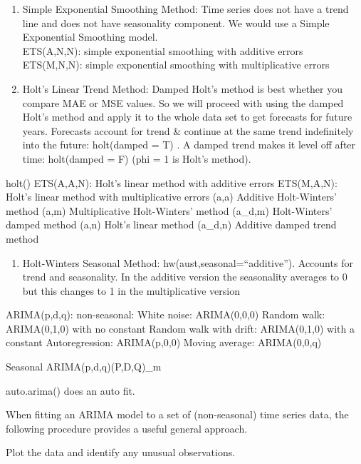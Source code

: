 \documentclass[]{book}
\providecommand{\tightlist}{%
  \setlength{\itemsep}{0pt}\setlength{\parskip}{0pt}}
\theoremstyle{definition}
\theoremstyle{definition}
\theoremstyle{definition}
\theoremstyle{remark}
\begin{document}
\begin{enumerate}
\def\labelenumi{\arabic{enumi}.}
\item
  Simple Exponential Smoothing Method: Time series does not have a trend
  line and does not have seasonality component. We would use a Simple
  Exponential Smoothing model.\\
  ETS(A,N,N): simple exponential smoothing with additive errors
  \textbar{} ETS(M,N,N): simple exponential smoothing with
  multiplicative errors
\item
  Holt's Linear Trend Method: Damped Holt's method is best whether you
  compare MAE or MSE values. So we will proceed with using the damped
  Holt's method and apply it to the whole data set to get forecasts for
  future years. Forecasts account for trend \& continue at the same
  trend indefinitely into the future: holt(damped = T) . A damped trend
  makes it level off after time: holt(damped = F) (phi = 1 is Holt's
  method).
\end{enumerate}

holt() \textbar{} ETS(A,A,N): Holt's linear method with additive errors
\textbar{} ETS(M,A,N): Holt's linear method with multiplicative errors
\textbar{} (a,a) Additive Holt-Winters' method \textbar{} (a,m)
Multiplicative Holt-Winters' method \textbar{} (a\_d,m) Holt-Winters'
damped method \textbar{} (a,n) Holt's linear method \textbar{} (a\_d,n)
Additive damped trend method

\begin{enumerate}
\def\labelenumi{\arabic{enumi}.}
\setcounter{enumi}{7}
\tightlist
\item
  Holt-Winters Seasonal Method: hw(aust,seasonal=``additive''). Accounts
  for trend and seasonality. In the additive version the seasonality
  averages to 0 but this changes to 1 in the multiplicative version
\end{enumerate}

ARIMA(p,d,q): non-seasonal: White noise: ARIMA(0,0,0) Random walk:
ARIMA(0,1,0) with no constant Random walk with drift: ARIMA(0,1,0) with
a constant Autoregression: ARIMA(p,0,0) Moving average: ARIMA(0,0,q)

Seasonal ARIMA(p,d,q)(P,D,Q)\_m

auto.arima() does an auto fit.

When fitting an ARIMA model to a set of (non-seasonal) time series data,
the following procedure provides a useful general approach.

Plot the data and identify any unusual observations.
\end{document}
